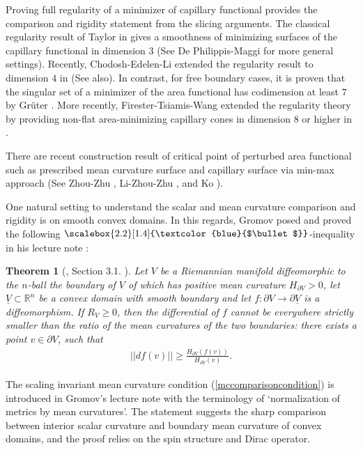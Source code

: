 \documentclass[11pt,letterpaper]{amsart}
\newcommand{\RN}[1]{%
  \textup{\uppercase\expandafter{\romannumeral#1}}%
}
\newcommand{\fillellipse}{\raisebox{0.2ex}{\scalebox{2.2}[1.4]{\textcolor{blue}{$\bullet$}}}}
\newtheorem{thm}[problem]{Theorem}
\begin{document}
Proving full regularity of a minimizer of capillary functional provides the comparison and rigidity statement from the slicing arguments. The classical regularity result of Taylor in \cite{taylor1977boundary} gives a smoothness of minimizing surfaces of the capillary functional in dimension $3$ (See De Philippis-Maggi \cite{philippis2015regularity} for more general settings). Recently, Chodosh-Edelen-Li extended the regularity result to dimension $4$ in \cite{chodosh2024improved} (See \cite{chodosh2025weiss} also). In contrast, for free boundary cases, it is proven that the singular set of a minimizer of the area functional has codimension at least $7$ by Grüter \cite{gruter1987optimal}. More recently, Firester-Tsiamis-Wang extended the regularity theory by providing non-flat area-minimizing capillary cones in dimension $8$ or higher in \cite{firester2026area}.

There are recent construction result of critical point of perturbed area functional such as prescribed mean curvature surface and capillary surface via min-max approach (See Zhou-Zhu \cite{zhou2018existence}, Li-Zhou-Zhu \cite{li2025min}, and Ko \cite{ko2023min}).

One natural setting to understand the scalar and mean curvature comparison and rigidity is on smooth convex domains. In this regards, Gromov posed and proved the following $\fillellipse$-inequality in his lecture note \cite{gromov2021lecturesscalarcurvature}:
\begin{thm} [\cite{gromov2021lecturesscalarcurvature}, Section 3.1.\RN{2}] \label{blueellipseineq}
    Let $V$ be a Riemannian manifold diffeomorphic to the $n$-ball the boundary of $V$ of which has positive mean curvature $H_{\partial V} >0$, let $\underline{V} \subset \mathbb{R}^{n}$ be a convex domain with smooth boundary and let $f: \partial V \rightarrow \partial \underline{V}$ is a diffeomorphism. If $R_{V} \ge 0$, then the differential of $f$ cannot be everywhere strictly smaller than the ratio of the mean curvatures of the two boundaries: there exists a point $v \in \partial V$, such that
    \begin{align} \label{mccomparisoncondition}
    ||df(v)|| \ge \frac{H_{\partial V}(f(v))}{H_{\partial \underline{V}}(v)}.
    \end{align}
\end{thm}
The scaling invariant mean curvature condition (\ref{mccomparisoncondition}) is introduced in Gromov's lecture note with the terminology of `normalization of metrics by mean curvatures'. The statement suggests the sharp comparison between interior scalar curvature and boundary mean curvature of convex domains, and the proof relies on the spin structure and Dirac operator.
\end{document}

